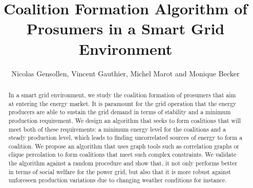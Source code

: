 \documentclass[conference]{IEEEtran}
\begin{document}
%
%
\title{Coalition Formation Algorithm of Prosumers in a Smart Grid Environment}

%
%
\author{Nicolas Gensollen, Vincent Gauthier, Michel Marot and Monique Becker \\
}

\maketitle

%
%
\begin{abstract}
In a smart grid environment, we study the coalition formation of prosumers that aim at entering the energy market. It is paramount for the grid operation that the energy producers are able to sustain the grid demand in terms of stability and a minimum production requirement. We design an algorithm that seeks to form coalitions that will meet both of these requirements:  a minimum energy level for the coalitions and a steady production level, which leads to finding uncorrelated sources of energy  to form a coalition. We propose an algorithm that uses graph tools such as correlation graphs or clique percolation to form coalitions that meet such complex constraints. We validate the algorithm against a random procedure and show that, it not only performs better in terms of social welfare for the power grid, but also that it is more robust against unforeseen production variations due to changing weather conditions for instance. 
\end{abstract}

\IEEEpeerreviewmaketitle


%
%
\end{document}
